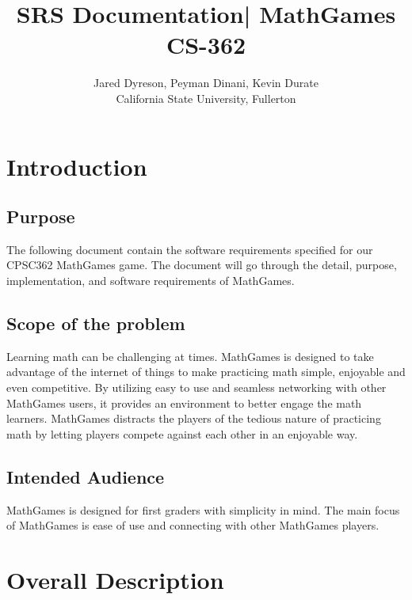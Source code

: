 \documentclass[12pt]{article}
\title{SRS Documentation| MathGames CS-362}
\author{Jared Dyreson, Peyman Dinani, Kevin Durate \\
        California State University, Fullerton}
\date
\begin{document}
\begin{titlingpage}
\maketitle
\end{titlingpage}

\newpage

\tableofcontents

\newpage

\section{Introduction}

\subsection{Purpose}

The following document contain the software requirements specified for our CPSC362 MathGames game. 
The document will go through the detail, purpose, implementation, and software requirements of MathGames.

\subsection{Scope of the problem}

Learning math can be challenging at times. 
MathGames is designed to take advantage of the internet of things to make practicing math simple, enjoyable and even competitive. 
By utilizing easy to use and seamless networking with other MathGames users, it provides an environment to better engage the math learners. 
MathGames distracts the players of the tedious nature of practicing math by letting players compete against each other in an enjoyable way.    

\subsection{Intended Audience}

MathGames is designed for first graders with simplicity in mind. 
The main focus of MathGames is ease of use and connecting with other MathGames players.

\newpage

\section{Overall Description}
\end{document}
